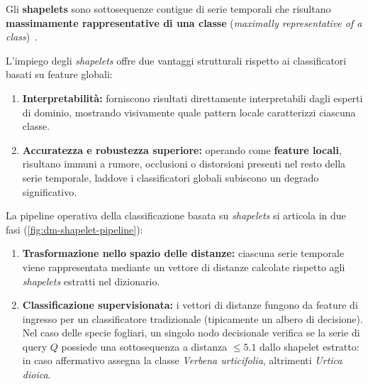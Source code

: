 \begin{definition}
Gli \textbf{shapelets} sono sottosequenze contigue di serie temporali che risultano \textbf{massimamente rappresentative di una classe} (\textit{maximally representative of a class})~\cite{ye2009}.
\end{definition}

L'impiego degli \textit{shapelets} offre due vantaggi strutturali rispetto ai classificatori basati su feature globali:
\begin{enumerate}
    \item \textbf{Interpretabilit\`a:} forniscono risultati direttamente interpretabili dagli esperti di dominio, mostrando visivamente quale pattern locale caratterizzi ciascuna classe.
    \item \textbf{Accuratezza e robustezza superiore:} operando come \textbf{feature locali}, risultano immuni a rumore, occlusioni o distorsioni presenti nel resto della serie temporale, laddove i classificatori globali subiscono un degrado significativo.
\end{enumerate}

La pipeline operativa della classificazione basata su \textit{shapelets} si articola in due fasi (\autoref{fig:dm-shapelet-pipeline}):
\begin{enumerate}
    \item \textbf{Trasformazione nello spazio delle distanze:} ciascuna serie temporale viene rappresentata mediante un vettore di distanze calcolate rispetto agli \textit{shapelets} estratti nel dizionario.
    \item \textbf{Classificazione supervisionata:} i vettori di distanze fungono da feature di ingresso per un classificatore tradizionale (tipicamente un albero di decisione). Nel caso delle specie fogliari, un singolo nodo decisionale verifica se la serie di query $Q$ possiede una sottosequenza a distanza $\le 5.1$ dallo shapelet estratto: in caso affermativo assegna la classe \textit{Verbena urticifolia}, altrimenti \textit{Urtica dioica}.
\end{enumerate}

